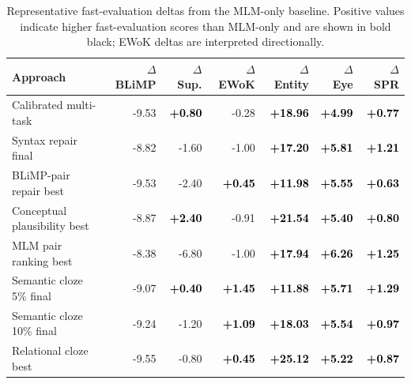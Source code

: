 \begin{table}[t]
\centering
\small
\setlength{\tabcolsep}{4pt}
\begin{tabular}{lrrrrrr}
\toprule
\textbf{Approach} & \textbf{$\Delta$ BLiMP} & \textbf{$\Delta$ Sup.} & \textbf{$\Delta$ EWoK} & \textbf{$\Delta$ Entity} & \textbf{$\Delta$ Eye} & \textbf{$\Delta$ SPR} \\
\midrule
\rowcolor{tablegray} Calibrated multi-task & -9.53 & \textcolor{black}{\textbf{+0.80}} & -0.28 & \textcolor{black}{\textbf{+18.96}} & \textcolor{black}{\textbf{+4.99}} & \textcolor{black}{\textbf{+0.77}} \\
Syntax repair final & -8.82 & -1.60 & -1.00 & \textcolor{black}{\textbf{+17.20}} & \textcolor{black}{\textbf{+5.81}} & \textcolor{black}{\textbf{+1.21}} \\
\rowcolor{tablegray} BLiMP-pair repair best & -9.53 & -2.40 & \textcolor{black}{\textbf{+0.45}} & \textcolor{black}{\textbf{+11.98}} & \textcolor{black}{\textbf{+5.55}} & \textcolor{black}{\textbf{+0.63}} \\
Conceptual plausibility best & -8.87 & \textcolor{black}{\textbf{+2.40}} & -0.91 & \textcolor{black}{\textbf{+21.54}} & \textcolor{black}{\textbf{+5.40}} & \textcolor{black}{\textbf{+0.80}} \\
\rowcolor{tablegray} MLM pair ranking best & -8.38 & -6.80 & -1.00 & \textcolor{black}{\textbf{+17.94}} & \textcolor{black}{\textbf{+6.26}} & \textcolor{black}{\textbf{+1.25}} \\
Semantic cloze 5\% final & -9.07 & \textcolor{black}{\textbf{+0.40}} & \textcolor{black}{\textbf{+1.45}} & \textcolor{black}{\textbf{+11.88}} & \textcolor{black}{\textbf{+5.71}} & \textcolor{black}{\textbf{+1.29}} \\
\rowcolor{tablegray} Semantic cloze 10\% final & -9.24 & -1.20 & \textcolor{black}{\textbf{+1.09}} & \textcolor{black}{\textbf{+18.03}} & \textcolor{black}{\textbf{+5.54}} & \textcolor{black}{\textbf{+0.97}} \\
Relational cloze best & -9.55 & -0.80 & \textcolor{black}{\textbf{+0.45}} & \textcolor{black}{\textbf{+25.12}} & \textcolor{black}{\textbf{+5.22}} & \textcolor{black}{\textbf{+0.87}} \\
\bottomrule
\end{tabular}
\caption{Representative fast-evaluation deltas from the MLM-only baseline. Positive values indicate higher fast-evaluation scores than MLM-only and are shown in bold black; EWoK deltas are interpreted directionally.}
\label{tab:delta-results}
\end{table}
